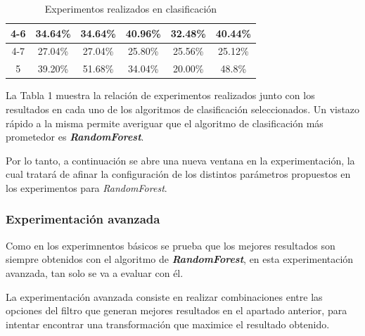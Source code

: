\documentclass[12pt,a4paper, xcolor=table]{article}
\begin{document}
\begin{table}[h]
\begin{tabular}{|c|c|c|c|c|c|}
            4-6                     & 34.64\%                   & 34.64\%        & 40.96\%                    & 32.48\%         & 40.44\%            \\ \hline
            4-7                     & 27.04\%                   & 27.04\%        & 25.80\%                    & 25.56\%         & 25.12\%            \\ \hline
            5                       & 39.20\%                   & 51.68\%        & 34.04\%                    & 20.00\%         & 48.8\%            \\ \hline
            \end{tabular}
            \caption{Experimentos realizados en clasificación}
                \label{fig:graf_exp1}
        \end{table}

        La Tabla 1 muestra la relación de experimentos realizados junto con los resultados en cada uno de los algoritmos de clasificación seleccionados. Un vistazo rápido a la misma permite averiguar que el algoritmo de clasificación más prometedor es \textbf{\textit{RandomForest}}.

        \vspace{2mm}

        Por lo tanto, a continuación se abre una nueva ventana en la experimentación, la cual tratará de afinar la configuración de los distintos parámetros propuestos en los experimentos para \textit{RandomForest}.

        \subsubsection{Experimentación avanzada}

        Como en los experimnentos básicos se prueba que los mejores resultados son siempre obtenidos con el algoritmo de \textbf{\textit{RandomForest}}, en esta experimentación avanzada, tan solo se va a evaluar con él.

        \vspace{3mm}

        La experimentación avanzada consiste en realizar combinaciones entre las opciones del filtro que generan mejores resultados en el apartado anterior, para intentar encontrar una transformación que maximice el resultado obtenido.
\end{document}
